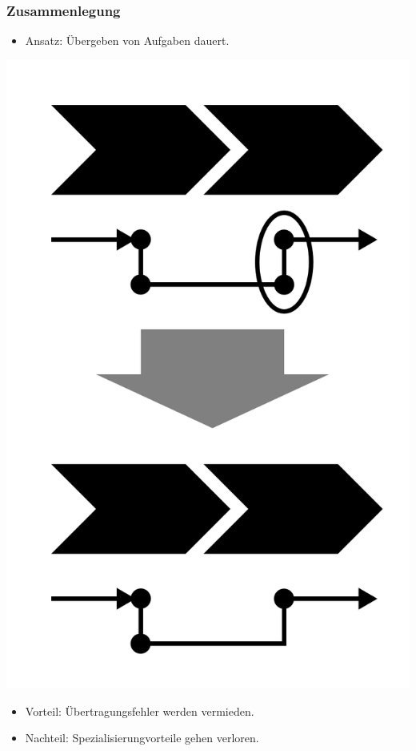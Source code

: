 \documentclass{beamer}
\begin{document}
 \begin{frame}
  \frametitle{Zusammenlegung}
  \begin{itemize}
    \item Ansatz: Übergeben von Aufgaben dauert.
  \end{itemize}
  \centerline{\includegraphics[scale=2.5]{4_6_3.png}}
  \begin{itemize}
    \item Vorteil: Übertragungsfehler werden vermieden.
    \item Nachteil: Spezialisierungvorteile gehen verloren.
  \end{itemize}
 \end{frame}
\end{document}
